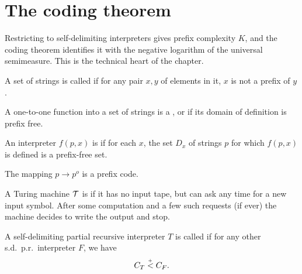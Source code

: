 

\section{The coding theorem}
Restricting to self-delimiting interpreters gives prefix complexity $K$, and the coding
theorem identifies it with the negative logarithm of the universal semimeasure. This is
the technical heart of the chapter.


 \begin{definition}
  \label{def:prefix-free}
  \leanok
A set of strings is called  if for any pair \( x,y \) of
elements in it, \( x \) is not a prefix of \( y \).

A one-to-one function into a set of strings is a
, or  if its domain of definition is
prefix free. 

An interpreter
\( f(p,x) \) is  if for each \( x \), the set
\( D_{x} \) of strings \( p \) for which \( f(p,x) \) is defined is a prefix-free set.
 \end{definition}

 \begin{example}
  \label{ex:selfdelim-code}
The mapping \( p \to p^o \) is a prefix code.
 \end{example}

\begin{definition}
  \label{def:sd-machine}
  \leanok
A Turing machine \( \mathcal{T} \) is  if it
has no input tape, but can ask any time for a new input symbol. 
After some computation and a few such requests (if ever) the
machine decides to write the output and stop. 
\end{definition}

\begin{definition}
  \label{def:sd-optimal}
  \leanok
A self-delimiting partial recursive 
interpreter \( T \) is called  if for any other s.d.~p.r.~interpreter \( F \), 
we have 
 \begin{equation} 	C_{T} \stackrel{{}_+}{<} C_{F}. \label{eq:sdopt}  
 \end{equation}
\end{definition}


